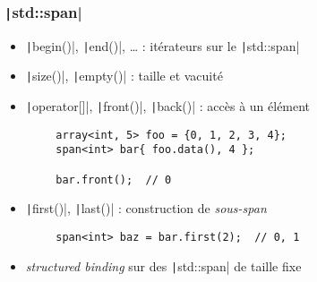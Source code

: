 \documentclass[C++.tex]{subfiles}
\begin{document}
\begin{frame}[fragile]
	\frametitle{\texttt|std::span|}
	\begin{itemize}
		\item \texttt|begin()|, \texttt|end()|, \ldots{} : itérateurs sur le \texttt|std::span|
		\item \texttt|size()|, \texttt|empty()| : taille et vacuité
		\item \texttt|operator[]|, \texttt|front()|, \texttt|back()| : accès à un élément
	\end{itemize}

	\begin{verbatim}
		array<int, 5> foo = {0, 1, 2, 3, 4};
		span<int> bar{ foo.data(), 4 };

		bar.front();  // 0
	\end{verbatim}

	\begin{itemize}
		\item \texttt|first()|, \texttt|last()| : construction de \textit{sous-span}
	\end{itemize}

	\begin{verbatim}
		span<int> baz = bar.first(2);  // 0, 1
	\end{verbatim}

	\begin{itemize}
		\item \textit{structured binding} sur des \texttt|std::span| de taille fixe
	\end{itemize}


\end{frame}
\end{document}
